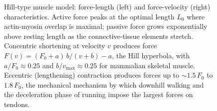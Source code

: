 \begin{figure}[htbp]
\caption{Hill-type muscle model: force-length (left) and force-velocity
(right) characteristics. Active force peaks at the optimal length
$L_0$ where actin-myosin overlap is maximal; passive force grows
exponentially above resting length as the connective-tissue elements
stretch. Concentric shortening at velocity $v$ produces force
$F(v) = (F_0 + a)\,b / (v + b) - a$, the Hill hyperbola, with
$a/F_0 \approx 0.25$ and $b/v_{\max} \approx 0.25$ for mammalian
skeletal muscle. Eccentric (lengthening) contraction produces forces
up to $\sim 1.5\,F_0$ to $1.8\,F_0$, the mechanical mechanism by
which downhill walking and the deceleration phase of running impose
the largest forces on tendons.}
\label{fig:vol06ch06:muscle-curves}
\end{figure}
